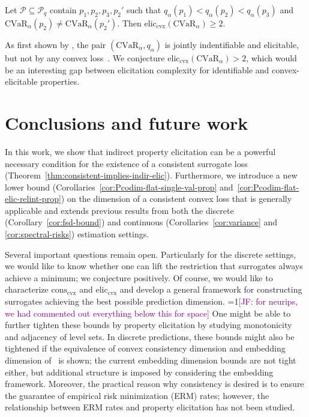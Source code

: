 \documentclass[anon,12pt]{colt2021} %
\newcommand{\Comments}{1}
\newcommand{\mynote}[2]{\ifnum\Comments=1\textcolor{#1}{#2}\fi}
\newcommand{\jessie}[1]{\mynote{purple}{[JF: #1]}}
\newcommand{\reals}{\mathbb{R}}
\newcommand{\eliccvx}{\mathrm{elic}_\mathrm{cvx}}
\newcommand{\conscvx}{\mathrm{cons}_\mathrm{cvx}}
\renewcommand{\P}{\mathcal{P}}
\newcommand{\Y}{\mathcal{Y}}
\newcommand{\CVaR}{\mathrm{CVaR}}
\begin{document}
\begin{corollary}
  \label{cor:spectral-risks}
  Let $\P\subseteq \P_q$ contain $p_1,p_2,p_3,p_2'$ such that $q_\alpha(p_1) < q_\alpha(p_2) < q_\alpha(p_3)$ and $\CVaR_\alpha(p_2) \neq \CVaR_\alpha(p_2')$.
  Then $\eliccvx(\CVaR_\alpha) \geq 2$.
\end{corollary}
As first shown by \citet{fissler2016higher}, the pair $(\CVaR_\alpha,q_\alpha)$ is jointly indentifiable and elicitable, but not by any convex loss~\citep[Prop.\ 4.2.31]{fissler2017higher}.
We conjecture $\eliccvx(\CVaR_\alpha) > 2$, which would be an interesting gap between elicitation complexity for identifiable and convex-elicitable properties.

\section{Conclusions and future work}\label{sec:conclusions}
In this work, we show that indirect property elicitation can be a powerful necessary condition for the existence of a consistent surrogate loss (Theorem~\ref{thm:consistent-implies-indir-elic}).
Furthermore, we introduce a new lower bound (Corollaries~\ref{cor:Pcodim-flat-single-val-prop} and~\ref{cor:Pcodim-flat-elic-relint-prop}) on the dimension of a consistent convex loss that is generally applicable and extends previous results from both the discrete (Corollary~\ref{cor:fsd-bound}) and continuous (Corollaries~\ref{cor:variance} and \ref{cor:spectral-risks}) estimation settings.

Several important questions remain open.
Particularly for the discrete settings, we would like to know whether one can lift the restriction that surrogates always achieve a minimum; we conjecture positively.
Of course, we would like to characterize $\conscvx$ and $\eliccvx$ and develop a general framework for constructing surrogates achieving the best possible prediction dimension.
\jessie{for neurips, we had commented out everything below this for space}
One might be able to further tighten these bounds by property elicitation by studying monotonicity and adjacency of level sets.
In discrete predictions, these bounds might also be tightened if the equivalence of convex consistency dimension and embedding dimension of~\citet{finocchiaro2020embedding} is shown; the current embedding dimension bounds are not tight either, but additional structure is imposed by considering the embedding framework.
Moreover, the practical reason why consistency is desired is to ensure the guarantee of empirical risk minimization (ERM) rates; however, the relationship between ERM rates and property elicitation has not been studied.
\end{document}
